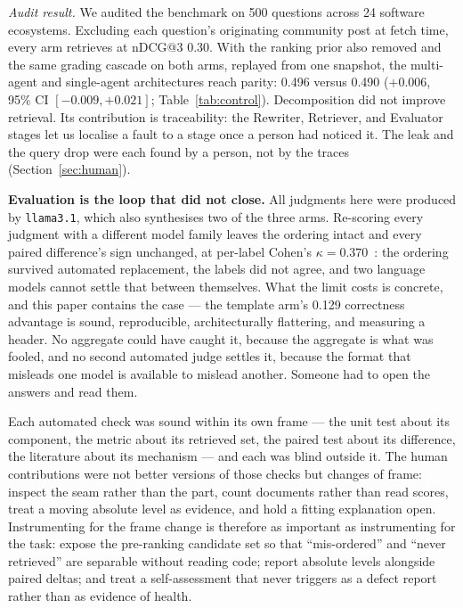\documentclass[10pt,conference]{IEEEtran}
\begin{document}
\emph{Audit result.} We audited the benchmark on 500 questions across 24
software ecosystems. Excluding each question's originating community post at
fetch time, every arm retrieves at nDCG@3 0.30. With the ranking prior also
removed and the same grading cascade on both arms, replayed from one snapshot, the
multi-agent and single-agent architectures reach parity: 0.496 versus 0.490
($+0.006$, 95\% CI $[-0.009,+0.021]$; Table~\ref{tab:control}). Decomposition did
not improve retrieval. Its contribution is traceability: the Rewriter, Retriever,
and Evaluator stages let us localise a fault to a stage once a person had noticed
it. The leak and the query drop were each found by a person, not by the traces
(Section~\ref{sec:human}).

\textbf{Evaluation is the loop that did not close.} All judgments here were
produced by \texttt{llama3.1}, which also synthesises two of the three arms.
Re-scoring every judgment with a different model family leaves the ordering intact
and every paired difference's sign unchanged, at per-label Cohen's
$\kappa=0.370$~\cite{cohen1960coefficient}: the ordering survived automated
replacement, the labels did not agree, and two language models cannot settle that
between themselves. What the limit costs is concrete, and this paper contains the
case --- the template arm's 0.129 correctness advantage is sound, reproducible,
architecturally flattering, and measuring a header. No aggregate could have caught
it, because the aggregate is what was fooled, and no second automated judge
settles it, because the format that misleads one model is available to mislead
another. Someone had to open the answers and read them.

Each automated check was sound within its own frame --- the unit test about its
component, the metric about its retrieved set, the paired test about its
difference, the literature about its mechanism --- and each was blind outside it.
The human contributions were not better versions of those checks but changes of
frame: inspect the seam rather than the part, count documents rather than read
scores, treat a moving absolute level as evidence, and hold a fitting explanation
open. Instrumenting for the frame change is therefore as important as instrumenting
for the task: expose the pre-ranking candidate set so that ``mis-ordered'' and
``never retrieved'' are separable without reading code; report absolute levels
alongside paired deltas; and treat a self-assessment that never triggers as a defect
report rather than as evidence of health.
\end{document}

